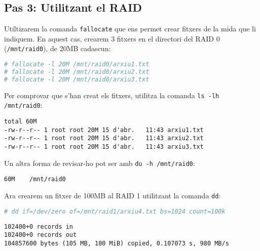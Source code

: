 \subsection{Pas 3: Utilitzant el RAID}\label{pas-3-utilitzant-la-raid}


Utiltizarem la comanda \texttt{fallocate} que ens permet crear fitxers de la mida que li indiquem. En aquest cas, crearem 3 fitxers en el directori del  RAID 0 (\texttt{/mnt/raid0}), de 20MB cadascun:

\begin{lstlisting}[language=bash, numbers=none, commentstyle=\color{black}]
# fallocate -l 20M /mnt/raid0/arxiu1.txt
# fallocate -l 20M /mnt/raid0/arxiu2.txt
# fallocate -l 20M /mnt/raid0/arxiu3.txt
\end{lstlisting}

Per comprovar que s'han creat els fitxers, utilitza la comanda \texttt{ls -lh /mnt/raid0}:

\begin{terminaloutput}
\footnotesize\begin{verbatim}
total 60M
-rw-r--r-- 1 root root 20M 15 d'abr.   11:43 arxiu1.txt
-rw-r--r-- 1 root root 20M 15 d'abr.   11:43 arxiu2.txt
-rw-r--r-- 1 root root 20M 15 d'abr.   11:43 arxiu3.txt
\end{verbatim}
\end{terminaloutput}

Un altra forma de revisar-ho pot ser amb \texttt{du -h /mnt/raid0}:

\begin{terminaloutput}
\footnotesize\begin{verbatim}
60M    /mnt/raid0
\end{verbatim}
\end{terminaloutput}

Ara crearem un fitxer de 100MB al RAID 1 utilitzant la comanda \texttt{dd}:

\begin{lstlisting}[language=bash, numbers=none, commentstyle=\color{black}]
# dd if=/dev/zero of=/mnt/raid1/arxiu4.txt bs=1024 count=100k
\end{lstlisting}

\begin{terminaloutput}
\footnotesize\begin{verbatim}
102400+0 records in
102400+0 records out
104857600 bytes (105 MB, 100 MiB) copied, 0.107073 s, 980 MB/s
\end{verbatim}
\end{terminaloutput}


